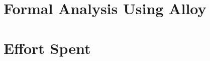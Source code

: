 \documentclass{Configuration_Files/PoliMi3i_thesis}
\begin{document}
\chapter{Formal Analysis Using Alloy}
\label{c:alloy}%


\chapter{Effort Spent}
\label{c:effort}%






\cleardoublepage
{} %





\cleardoublepage
\end{document}
